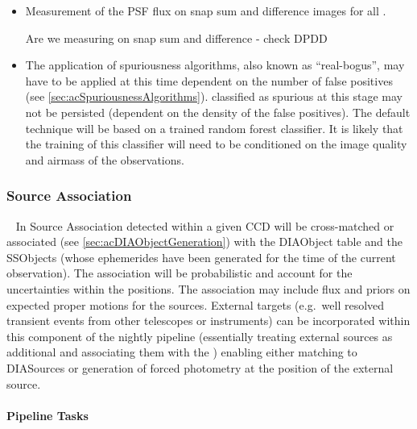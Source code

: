 \begin{itemize}
\item Measurement of the PSF flux on snap sum and difference images for all \DIASources.
\begin{note} Are we measuring on snap sum and difference - check DPDD\end{note}
\item The application of spuriousness algorithms, also known as ``real-bogus'', may have to be applied at this time dependent on the number of false positives (see \ref{sec:acSpuriousnessAlgorithms}). \DIASources classified as spurious at this stage may not be persisted (dependent on the density of the false positives). The default technique will be based on a trained random forest classifier. It is likely that the training of this classifier will need to be conditioned on the image quality and airmass of the observations.
\end{itemize}

\subsubsection{Source Association}~
\label{sec:apSourceAssoc}
In Source Association \DIASources detected within a given CCD will be cross-matched or associated (see \ref{sec:acDIAObjectGeneration}) with the DIAObject table and the SSObjects (whose ephemerides have been generated for the time of the current observation). The association will be probabilistic  and account for the uncertainties within the positions. The association may include flux and priors on expected proper motions for the sources. External targets (e.g.\ well resolved transient events from other telescopes or instruments) can be incorporated within this component of the nightly pipeline (essentially treating external sources as additional \DIAObjects and associating them with the \DIASources) enabling either matching to DIASources or generation of forced photometry at the position of the external source. 

\paragraph{Pipeline Tasks}


